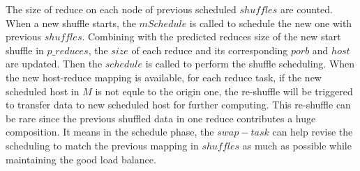 The size of reduce on each node of previous scheduled $shuffles$ are counted. When a new shuffle starts, the $mSchedule$ is called to schedule the new one with previous $shuffles$. Combining with the predicted reduces size of the new start shuffle in $p\_reduces$, the $size$ of each reduce and its corresponding $porb$ and $host$ are updated. Then the $schedule$ is called to perform the shuffle scheduling. When the new host-reduce mapping is available, for each reduce task, if the new scheduled host in $M$ is not equle to the origin one, the re-shuffle will be triggered to transfer data to new scheduled host for further computing. This re-shuffle can be rare since the previous shuffled data in one reduce contributes a huge composition. It means in the schedule phase, the $swap-task$ can help revise the scheduling to match the previous mapping in $shuffles$ as much as possible while maintaining the good load balance.